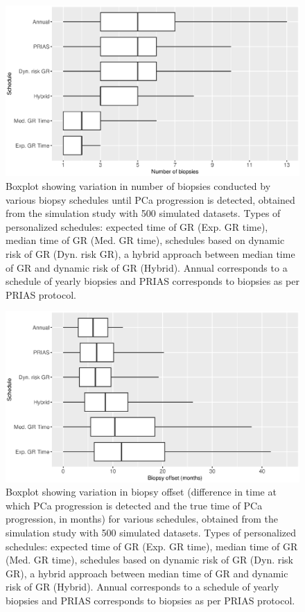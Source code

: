 \clearpage
    \begin{figure}[!htb]
    \centerline{\includegraphics[width=\columnwidth]{../images/sim_study/nbBoxPlot_all.eps}}
    \caption{Boxplot showing variation in number of biopsies conducted by various biopsy schedules until PCa progression is detected, obtained from the simulation study with 500 simulated datasets. Types of personalized schedules: expected time of GR (Exp. GR time), median time of GR (Med. GR time), schedules based on dynamic risk of GR (Dyn. risk GR), a hybrid approach between median time of GR and dynamic risk of GR (Hybrid). Annual corresponds to a schedule of yearly biopsies and PRIAS corresponds to biopsies as per PRIAS protocol.}
    \label{fig : nbBoxPlot_all}
    \end{figure}

\clearpage
    \begin{figure}[!htb]
    \centerline{\includegraphics[width=\columnwidth]{../images/sim_study/offsetBoxPlot_all.eps}}
    \caption{Boxplot showing variation in biopsy offset (difference in time at which PCa progression is detected and the true time of PCa progression, in months) for various schedules, obtained from the simulation study with 500 simulated datasets. Types of personalized schedules: expected time of GR (Exp. GR time), median time of GR (Med. GR time), schedules based on dynamic risk of GR (Dyn. risk GR), a hybrid approach between median time of GR and dynamic risk of GR (Hybrid). Annual corresponds to a schedule of yearly biopsies and PRIAS corresponds to biopsies as per PRIAS protocol.}
    \label{fig : offsetBoxPlot_all}
    \end{figure}
        
        
